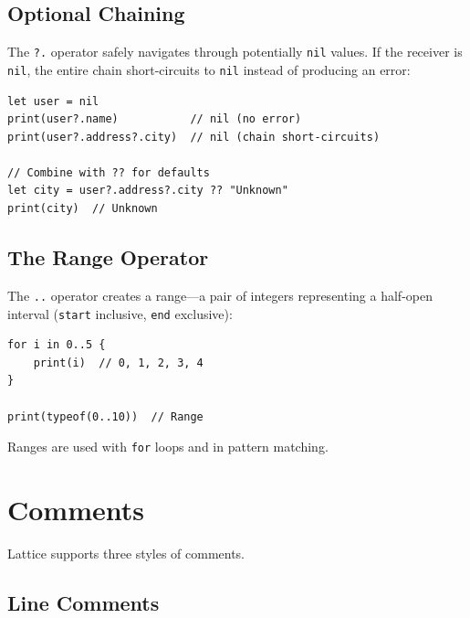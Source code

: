 \subsection{Optional Chaining}\label{subsec:optional-chaining}

The \lstinline|?.| operator safely navigates through potentially \lstinline|nil| values.
If the receiver is \lstinline|nil|, the entire chain short-circuits to \lstinline|nil| instead of producing an error:

\begin{lstlisting}[language=Lattice, caption={Optional chaining}]
let user = nil
print(user?.name)           // nil (no error)
print(user?.address?.city)  // nil (chain short-circuits)

// Combine with ?? for defaults
let city = user?.address?.city ?? "Unknown"
print(city)  // Unknown
\end{lstlisting}

\subsection{The Range Operator}\label{subsec:range-operator}

The \lstinline|..| operator creates a range---a pair of integers representing a half-open interval (\lstinline|start| inclusive, \lstinline|end| exclusive):

\begin{lstlisting}[language=Lattice, caption={Range operator}]
for i in 0..5 {
    print(i)  // 0, 1, 2, 3, 4
}

print(typeof(0..10))  // Range
\end{lstlisting}

Ranges are used with \lstinline|for| loops and in pattern matching.

\section{Comments}\label{sec:comments}

Lattice supports three styles of comments.

\subsection{Line Comments}\label{subsec:line-comments}

